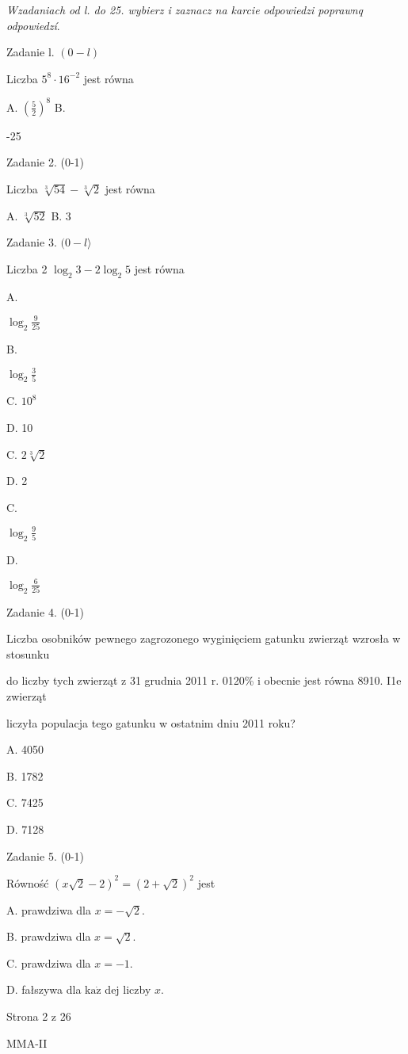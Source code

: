 \documentclass[a4paper,12pt]{article}
\begin{document}
{\it Wzadaniach od l. do 25. wybierz i zaznacz na karcie odpowiedzi poprawnq odpowiedzí}.

Zadanie l. $(0-l)$

Liczba $5^{8}\cdot 16^{-2}$ jest równa

A. $(\displaystyle \frac{5}{2})^{8}$ B.

-25

Zadanie 2. (0-1)

Liczba $\sqrt[3]{54}-\sqrt[3]{2}$ jest równa

A. $\sqrt[3]{52}$ B. 3

Zadanie 3. $(0-l\rangle$

Liczba 2 $\log_{2}3-2\log_{2}5$ jest równa

A.

$\displaystyle \log_{2}\frac{9}{25}$

B.

$\log_{2} \displaystyle \frac{3}{5}$

C. $10^{8}$

D. 10

C. $2\sqrt[3]{2}$

D. 2

C.

$\log_{2} \displaystyle \frac{9}{5}$

D.

$\displaystyle \log_{2}\frac{6}{25}$

Zadanie 4. (0-1)

Liczba osobników pewnego zagrozonego wyginięciem gatunku zwierząt wzrosła w stosunku

do liczby tych zwierząt z 31 grudnia 2011 r. 0120\% i obecnie jest równa 8910. I1e zwierząt

liczyła populacja tego gatunku w ostatnim dniu 2011 roku?

A. 4050

B. 1782

C. 7425

D. 7128

Zadanie 5. (0-1)

Równość $(x\sqrt{2}-2)^{2}=(2+\sqrt{2})^{2}$ jest

A. prawdziwa dla $x=-\sqrt{2}.$

B. prawdziwa dla $x=\sqrt{2}.$

C. prawdziwa dla $x=-1.$

D. fałszywa dla $\mathrm{k}\mathrm{a}\dot{\mathrm{z}}$ dej liczby $x.$

Strona 2 z 26

MMA-II
\end{document}
